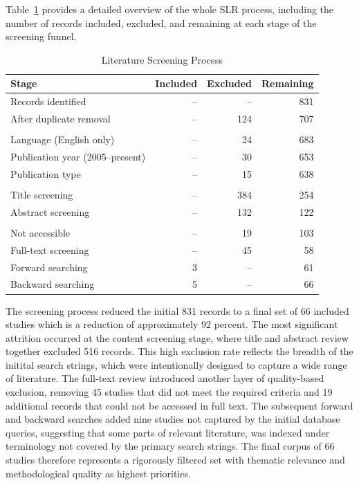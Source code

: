 \documentclass[12pt,oneside]{article}
\begin{document}
Table~\ref{tab:screening} provides a detailed overview of the whole \ac{SLR} process, including the number of records included, excluded, and remaining at each stage of the screening funnel.

\begin{table}[htbp]
\centering
\small
\caption{Literature Screening Process}
\label{tab:screening}
\begin{tabular}{@{} l r r r @{}}
\toprule
\textbf{Stage} & \textbf{Included} & \textbf{Excluded} & \textbf{Remaining} \\
\midrule
Records identified                       & --  & --  & 831 \\
After duplicate removal                  & --  & 124 & 707 \\
\addlinespace
\multicolumn{4}{@{}l}{\textit{Practical screening}} \\
\quad Language (English only)            & --  &  24 & 683 \\
\quad Publication year (2005--present)   & --  &  30 & 653 \\
\quad Publication type                   & --  &  15 & 638 \\
\addlinespace
\multicolumn{4}{@{}l}{\textit{Content screening}} \\
\quad Title screening                    & -- & 384 & 254 \\
\quad Abstract screening                 & -- & 132 & 122 \\
\addlinespace
\multicolumn{4}{@{}l}{\textit{Full-text review}} \\
\quad Not accessible                     &  -- &  19 &  103 \\
\quad Full-text screening             & --  &  45 &  58 \\
\quad Forward searching                      &  3 &  -- &  61 \\
\quad Backward searching                     &  5 &  -- &  66 \\
\bottomrule
\end{tabular}
\end{table}

\newpage

The screening process reduced the initial 831 records to a final set of 66 included studies which is a reduction of approximately 92 percent. The most significant attrition occurred at the content screening stage, where title and abstract review together excluded 516 records. This high exclusion rate reflects the breadth of the initital search strings, which were intentionally designed to capture a wide range of literature. The full-text review introduced another layer of quality-based exclusion, removing 45 studies that did not meet the required criteria and 19 additional records that could not be accessed in full text. The subsequent forward and backward searches added nine studies not captured by the initial database queries, suggesting that some parts of relevant literature, was indexed under terminology not covered by the primary search strings. The final corpus of 66 studies therefore represents a rigorously filtered set with thematic relevance and methodological quality as highest priorities.
\end{document}
